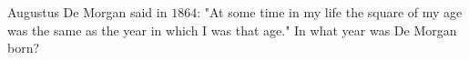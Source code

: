 Augustus De Morgan said in $1864$: "At some time in my life the square of my age was the same as the year in which I was that age." In what year was De Morgan born?
